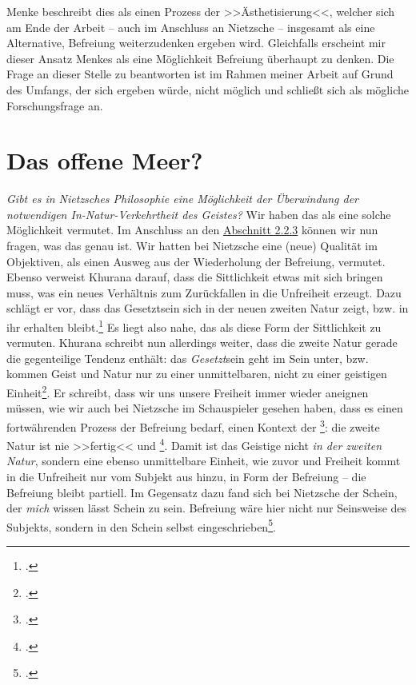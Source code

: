 \documentclass[12pt, a4paper, openany]{report}
\begin{document}
Menke beschreibt dies als einen Prozess der >>Ästhetisierung<<, welcher sich am Ende der Arbeit -- auch im Anschluss an Nietzsche -- insgesamt als eine Alternative, Befreiung weiterzudenken ergeben wird. 
Gleichfalls erscheint mir dieser Ansatz Menkes als eine Möglichkeit Befreiung überhaupt zu denken. 
Die Frage an dieser Stelle zu beantworten ist im Rahmen meiner Arbeit auf Grund des Umfangs, der sich ergeben würde, nicht möglich und schließt sich als mögliche Forschungsfrage an.

\section{Das offene Meer?}\label{abschnitt_4}
\textit{Gibt es in Nietzsches Philosophie eine Möglichkeit der Überwindung der notwendigen In-Natur-Verkehrtheit des Geistes?} 
Wir haben das  als eine solche Möglichkeit vermutet.
Im Anschluss an den \hyperref[abschnitt_2_3]{Abschnitt 2.2.3} können wir nun fragen, was das  genau ist.
Wir hatten bei Nietzsche eine (neue) Qualität im Objektiven, als einen Ausweg aus der Wiederholung der Befreiung, vermutet.
Ebenso verweist Khurana darauf, dass die Sittlichkeit etwas mit sich bringen muss, was ein neues Verhältnis zum Zurückfallen in die Unfreiheit erzeugt.
Dazu schlägt er vor, dass das Gesetztsein sich in der neuen zweiten Natur zeigt, bzw. in ihr erhalten bleibt.\footcite[Vgl.][401]{khurana_freiheit_2017}
Es liegt also nahe, das  als diese Form der Sittlichkeit zu vermuten. 
Khurana schreibt nun allerdings weiter, dass die zweite Natur gerade die gegenteilige Tendenz enthält: das \emph{Gesetzt}sein geht im Sein unter, bzw. kommen Geist und Natur nur zu einer unmittelbaren, nicht zu einer geistigen Einheit\footcite[Vgl.][402]{khurana_freiheit_2017}.
Er schreibt, dass wir uns unsere Freiheit immer wieder aneignen müssen, wie wir auch bei Nietzsche im Schauspieler gesehen haben, dass es einen fortwährenden Prozess der Befreiung bedarf, einen Kontext der \footcite[][402]{khurana_freiheit_2017}: 
die zweite Natur ist nie >>fertig<< und \footcite[][81]{menke_autonomie_2018}.
Damit ist das Geistige nicht \emph{in der zweiten Natur}, sondern eine ebenso unmittelbare Einheit, wie zuvor und Freiheit kommt in die Unfreiheit nur vom Subjekt aus hinzu, in Form der Befreiung -- die Befreiung bleibt partiell. 
Im Gegensatz dazu fand sich bei Nietzsche der Schein, der \emph{mich} wissen lässt Schein zu sein. 
Befreiung wäre hier nicht nur Seinsweise des Subjekts, sondern in den Schein selbst eingeschrieben\footcite[Vgl.][339]{khurana_freiheit_2017}.
\end{document}
